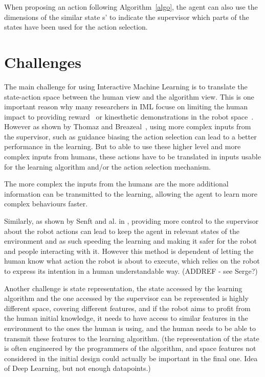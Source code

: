 \documentclass[letterpaper]{article} %
\begin{document}
When proposing an action following Algorithm~\ref{algo}, the agent can also use
the dimensions of the similar state s' to indicate the supervisor which parts of
the states have been used for the action selection.

\section{Challenges}

The main challenge for using Interactive Machine Learning is to translate the
state-action space between the human view and the algorithm view. This is one
important reason why many researchers in IML focuse on limiting the human impact
to providing reward~\cite{knox2009interactively} or kinesthetic demonstrations
in the robot space~\cite{billard2008robot}. However as shown by Thomaz and Breazeal~\cite{thomaz2008teachable}, using more complex inputs from the supervisor, such
as guidance biasing the action selection can lead to a better performance in the
learning. But to able to use these higher level and more complex inputs from
humans, these actions have to be translated in inputs usable for the learning
algorithm and/or the action selection mechanism. 

The more complex the inputs from the humans are the more additional information
can be transmitted to the learning, allowing the agent to learn more complex
behaviours faster.

Similarly, as shown by Senft and al. in \cite{senft2017supervised}, providing
more control to the supervisor about the robot actions can lead to keep the
agent in relevant states of the environment and as such speeding the learning
and making it safer for the robot and people interacting with it. However this
method is dependent of letting the human know what action the robot is about to
execute, which relies on the robot to express its intention in a human
understandable way. (ADDREF - see Serge?)

Another challenge is state representation, the state accessed by the learning
algorithm and the one accessed by the supervisor can be represented is highly
different space, covering different features, and if the robot aims to profit
from the human initial knowledge, it needs to have access to similar features in
the environment to the ones the human is using, and the human needs to be able
to transmit these features to the learning algorithm.
(the representation of the state is often engineered by the programmers of the
algorithm, and space features not considered in the initial design could
actually be important in the final one. Idea of Deep Learning, but not enough
datapoints.)
\end{document}
